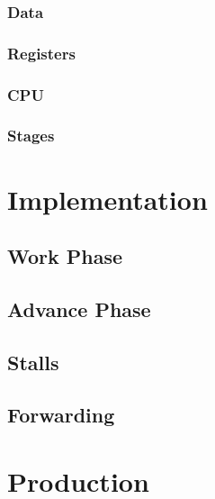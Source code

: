 \documentclass[12pt]{article}
\begin{document}
\subsubsection{Data}

\subsubsection{Registers}

\subsubsection{CPU}

\subsubsection{Stages}

\section{Implementation}
\label{sec:implementation}

\subsection{Work Phase}

\subsection{Advance Phase}

\subsection{Stalls}

\subsection{Forwarding}


\section{Production}
\label{sec:production}
\end{document}
